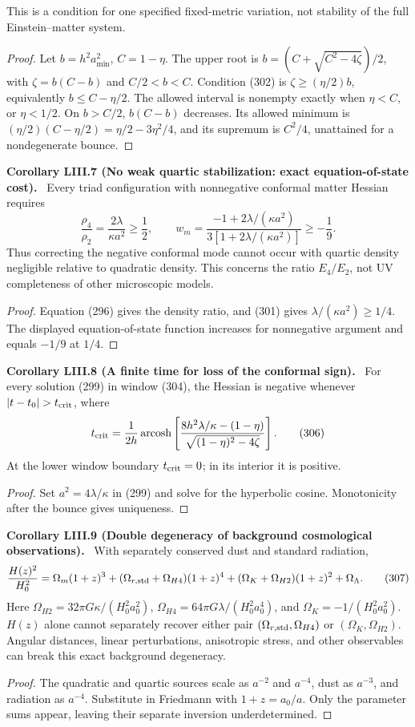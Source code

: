 \documentclass[11pt,a4paper,oneside]{book}
\newcommand{\statement}[3]{\par\medskip\noindent\textbf{#1 #2 (#3).}\ }
\begin{document}
This is a condition for one specified fixed-metric variation, not stability of the full Einstein--matter system.
\begin{proof}
Let $b=h^2a_{\min}^2$, $C=1-\eta$. The upper root is $b=(C+\sqrt{C^2-4\zeta})/2$, with $\zeta=b(C-b)$ and $C/2<b<C$. Condition (302) is $\zeta\ge(\eta/2)b$, equivalently $b\le C-\eta/2$. The allowed interval is nonempty exactly when $\eta<C$, or $\eta<1/2$. On $b>C/2$, $b(C-b)$ decreases. Its allowed minimum is $(\eta/2)(C-\eta/2)=\eta/2-3\eta^2/4$, and its supremum is $C^2/4$, unattained for a nondegenerate bounce.
\end{proof}
\statement{Corollary}{LIII.7}{No weak quartic stabilization: exact equation-of-state cost}
Every triad configuration with nonnegative conformal matter Hessian requires
\begin{equation}\frac{\rho_4}{\rho_2}=\frac{2\lambda}{\kappa a^2}\ge\frac12,\qquad w_m=\frac{-1+2\lambda/(\kappa a^2)}{3[1+2\lambda/(\kappa a^2)]}\ge-\frac19.\tag{305}\end{equation}
Thus correcting the negative conformal mode cannot occur with quartic density negligible relative to quadratic density. This concerns the ratio $E_4/E_2$, not UV completeness of other microscopic models.
\begin{proof}
Equation (296) gives the density ratio, and (301) gives $\lambda/(\kappa a^2)\ge1/4$. The displayed equation-of-state function increases for nonnegative argument and equals $-1/9$ at $1/4$.
\end{proof}
\statement{Corollary}{LIII.8}{A finite time for loss of the conformal sign}
For every solution (299) in window (304), the Hessian is negative whenever $|t-t_0|>t_{\rm crit}$, where
\begin{equation}t_{\rm crit}=\frac1{2h}\operatorname{arcosh}\left[\frac{8h^2\lambda/\kappa-(1-\eta)}{\sqrt{(1-\eta)^2-4\zeta}}\right].\tag{306}\end{equation}
At the lower window boundary $t_{\rm crit}=0$; in its interior it is positive.
\begin{proof}
Set $a^2=4\lambda/\kappa$ in (299) and solve for the hyperbolic cosine. Monotonicity after the bounce gives uniqueness.
\end{proof}
\statement{Corollary}{LIII.9}{Double degeneracy of background cosmological observations}
With separately conserved dust and standard radiation,
\begin{equation}\frac{H(z)^2}{H_0^2}=\Omega_m(1+z)^3+(\Omega_{r,\rm std}+\Omega_{H4})(1+z)^4+(\Omega_K+\Omega_{H2})(1+z)^2+\Omega_\Lambda.\tag{307}\end{equation}
Here $\Omega_{H2}=32\pi G\kappa/(H_0^2a_0^2)$, $\Omega_{H4}=64\pi G\lambda/(H_0^2a_0^4)$, and $\Omega_K=-1/(H_0^2a_0^2)$. $H(z)$ alone cannot separately recover either pair $(\Omega_{r,\rm std},\Omega_{H4})$ or $(\Omega_K,\Omega_{H2})$. Angular distances, linear perturbations, anisotropic stress, and other observables can break this exact background degeneracy.
\begin{proof}
The quadratic and quartic sources scale as $a^{-2}$ and $a^{-4}$, dust as $a^{-3}$, and radiation as $a^{-4}$. Substitute in Friedmann with $1+z=a_0/a$. Only the parameter sums appear, leaving their separate inversion underdetermined.
\end{proof}
\end{document}
